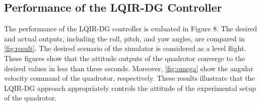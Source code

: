 \documentclass[conference]{IEEEtran}
\begin{document}

\subsection{Performance of the LQIR-DG Controller}

\noindent The performance of the LQIR-DG controller is evaluated in Figure 8. The desired and actual outputs, including the roll, pitch, and yaw angles, are compared in \figurename{\ref{fig:result}}. The desired scenario of the simulator is considered as a level flight. These figures show that the attitude outputs of the quadrotor converge to the desired values in less than three seconds. Moreover, \figurename{\ref{fig:omega}} show the angular velocity command of the quadrotor, 
respectively. These results illustrate that the LQIR-DG approach appropriately controls the attitude of the experimental setup of the quadrotor.
\end{document}

